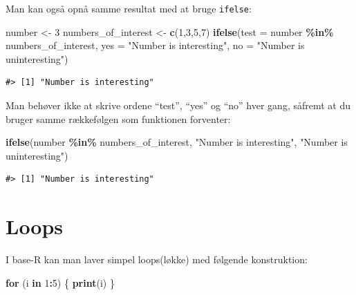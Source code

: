 \documentclass[
]{book}
\newenvironment{Shaded}{\begin{snugshade}}{\end{snugshade}}
\newcommand{\AttributeTok}[1]{\textcolor[rgb]{0.27,0.27,0.27}{#1}}
\newcommand{\ControlFlowTok}[1]{\textcolor[rgb]{0.27,0.27,0.27}{\textbf{#1}}}
\newcommand{\DecValTok}[1]{\textcolor[rgb]{0.06,0.06,0.06}{#1}}
\newcommand{\FunctionTok}[1]{\textcolor[rgb]{0.27,0.27,0.27}{\textbf{#1}}}
\newcommand{\NormalTok}[1]{#1}
\newcommand{\OtherTok}[1]{\textcolor[rgb]{0.37,0.37,0.37}{#1}}
\newcommand{\SpecialCharTok}[1]{\textcolor[rgb]{0.43,0.43,0.43}{\textbf{#1}}}
\newcommand{\StringTok}[1]{\textcolor[rgb]{0.5,0.5,0.5}{#1}}
\begin{document}
Man kan også opnå samme resultat med at bruge \texttt{ifelse}:

\begin{Shaded}
\begin{Highlighting}[]
\NormalTok{number }\OtherTok{\textless{}{-}} \DecValTok{3}
\NormalTok{numbers\_of\_interest }\OtherTok{\textless{}{-}} \FunctionTok{c}\NormalTok{(}\DecValTok{1}\NormalTok{,}\DecValTok{3}\NormalTok{,}\DecValTok{5}\NormalTok{,}\DecValTok{7}\NormalTok{)}
\FunctionTok{ifelse}\NormalTok{(}\AttributeTok{test =}\NormalTok{ number }\SpecialCharTok{\%in\%}\NormalTok{ numbers\_of\_interest, }
       \AttributeTok{yes =} \StringTok{"Number is interesting"}\NormalTok{,}
       \AttributeTok{no =}  \StringTok{"Number is uninteresting"}\NormalTok{)}
\end{Highlighting}
\end{Shaded}

\begin{verbatim}
#> [1] "Number is interesting"
\end{verbatim}

Man behøver ikke at skrive ordene ``test'', ``yes'' og ``no'' hver gang, såfremt at du bruger samme rækkefølgen som funktionen forventer:

\begin{Shaded}
\begin{Highlighting}[]
\FunctionTok{ifelse}\NormalTok{(number }\SpecialCharTok{\%in\%}\NormalTok{ numbers\_of\_interest, }
       \StringTok{"Number is interesting"}\NormalTok{,}
       \StringTok{"Number is uninteresting"}\NormalTok{)}
\end{Highlighting}
\end{Shaded}

\begin{verbatim}
#> [1] "Number is interesting"
\end{verbatim}

\section{Loops}\label{loops}

I base-R kan man laver simpel loops(løkke) med følgende konstruktion:

\begin{Shaded}
\begin{Highlighting}[]
\ControlFlowTok{for}\NormalTok{ (i }\ControlFlowTok{in} \DecValTok{1}\SpecialCharTok{:}\DecValTok{5}\NormalTok{) \{}
  \FunctionTok{print}\NormalTok{(i)}
\NormalTok{\}}
\end{Highlighting}
\end{Shaded}
\end{document}
